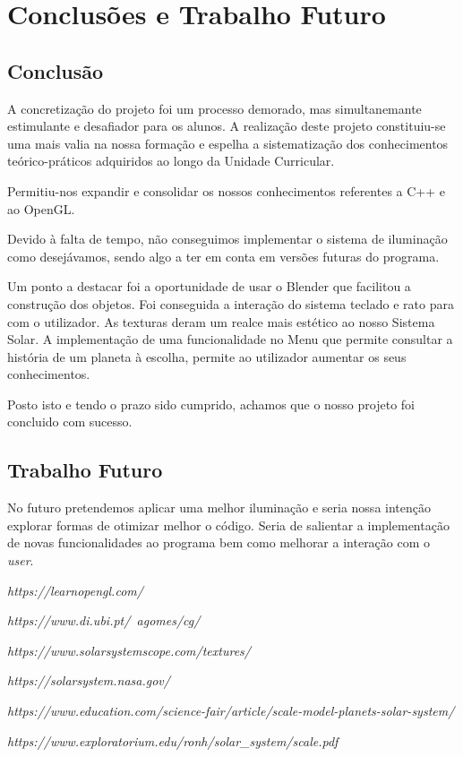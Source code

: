 \chapter{Conclusões e Trabalho Futuro}
\label{chap:conc-trab-futuro}

\section{Conclusão}
\label{sec:conc-princ}
A concretização do projeto  foi um processo demorado, mas simultanemante estimulante e desafiador para os alunos. A  realização  deste  projeto  constituiu-se  uma  mais  valia  na nossa formação e espelha a sistematização dos conhecimentos teórico-práticos adquiridos ao longo da Unidade Curricular.

Permitiu-nos expandir e consolidar os nossos conhecimentos referentes a C++ e ao OpenGL.

Devido à falta de tempo, não conseguimos implementar o sistema de iluminação como desejávamos, sendo algo a ter em conta em versões futuras do programa.

Um ponto a destacar foi a oportunidade de usar o Blender que facilitou a construção dos objetos.
Foi conseguida a interação do sistema teclado e rato para com o utilizador. As texturas deram um realce mais estético ao nosso Sistema Solar. A implementação de uma funcionalidade no Menu que permite consultar a história de um planeta à escolha, permite ao utilizador aumentar os seus conhecimentos.  

Posto isto e tendo o prazo sido cumprido, achamos que o nosso projeto foi concluido com sucesso.


\section{Trabalho Futuro}
\label{sec:trab-futuro}

No futuro pretendemos aplicar uma melhor iluminação e seria nossa intenção explorar formas de otimizar melhor o código. Seria de salientar a implementação de novas funcionalidades ao programa bem como melhorar a interação com o \textit{user}. 

\begin{thebibliography}{9}
\textit{https://learnopengl.com/}

\textit{https://www.di.ubi.pt/~agomes/cg/}

\textit{https://www.solarsystemscope.com/textures/}

\textit{https://solarsystem.nasa.gov/}

\textit{https://www.education.com/science-fair/article/scale-model-planets-solar-system/}

\textit{https://www.exploratorium.edu/ronh/solar_system/scale.pdf}
\end{thebibliography}